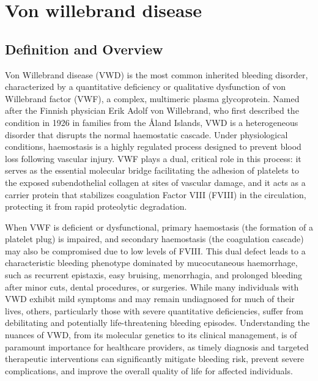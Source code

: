 \chapter{Von willebrand disease}

\section*{Definition and Overview}
Von Willebrand disease (VWD) is the most common inherited bleeding disorder, characterized by a quantitative deficiency or qualitative dysfunction of von Willebrand factor (VWF), a complex, multimeric plasma glycoprotein. Named after the Finnish physician Erik Adolf von Willebrand, who first described the condition in 1926 in families from the Åland Islands, VWD is a heterogeneous disorder that disrupts the normal haemostatic cascade. Under physiological conditions, haemostasis is a highly regulated process designed to prevent blood loss following vascular injury. VWF plays a dual, critical role in this process: it serves as the essential molecular bridge facilitating the adhesion of platelets to the exposed subendothelial collagen at sites of vascular damage, and it acts as a carrier protein that stabilizes coagulation Factor VIII (FVIII) in the circulation, protecting it from rapid proteolytic degradation.

When VWF is deficient or dysfunctional, primary haemostasis (the formation of a platelet plug) is impaired, and secondary haemostasis (the coagulation cascade) may also be compromised due to low levels of FVIII. This dual defect leads to a characteristic bleeding phenotype dominated by mucocutaneous haemorrhage, such as recurrent epistaxis, easy bruising, menorrhagia, and prolonged bleeding after minor cuts, dental procedures, or surgeries. While many individuals with VWD exhibit mild symptoms and may remain undiagnosed for much of their lives, others, particularly those with severe quantitative deficiencies, suffer from debilitating and potentially life-threatening bleeding episodes. Understanding the nuances of VWD, from its molecular genetics to its clinical management, is of paramount importance for healthcare providers, as timely diagnosis and targeted therapeutic interventions can significantly mitigate bleeding risk, prevent severe complications, and improve the overall quality of life for affected individuals.

